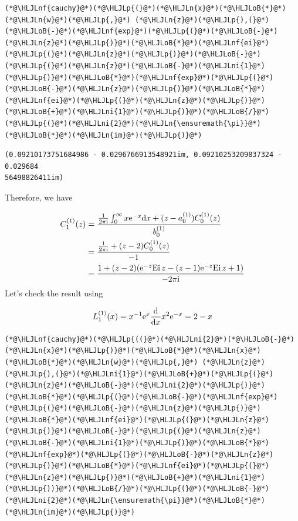 \documentclass[12pt,a4paper]{article}
\newcommand{\HLJLn}[1]{#1}
\newcommand{\HLJLnf}[1]{\textcolor[RGB]{66,102,213}{#1}}
\newcommand{\HLJLni}[1]{\textcolor[RGB]{59,151,46}{#1}}
\newcommand{\HLJLoB}[1]{\textcolor[RGB]{102,102,102}{\textbf{#1}}}
\newcommand{\HLJLp}[1]{#1}
\def\D{ {\rm d} }
\def\I{ {\rm i} }
\def\E{ {\rm e} }
\def\Ei{ {\rm Ei}\, }
\def\dx{\D x}
\begin{document}
\begin{lstlisting}
(*@\HLJLnf{cauchy}@*)(*@\HLJLp{(}@*)(*@\HLJLn{x}@*)(*@\HLJLoB{*}@*)(*@\HLJLn{w}@*)(*@\HLJLp{,}@*) (*@\HLJLn{z}@*)(*@\HLJLp{),(}@*)(*@\HLJLoB{-}@*)(*@\HLJLnf{exp}@*)(*@\HLJLp{(}@*)(*@\HLJLoB{-}@*)(*@\HLJLn{z}@*)(*@\HLJLp{)}@*)(*@\HLJLoB{*}@*)(*@\HLJLnf{ei}@*)(*@\HLJLp{(}@*)(*@\HLJLn{z}@*)(*@\HLJLp{)}@*)(*@\HLJLoB{-}@*)(*@\HLJLp{(}@*)(*@\HLJLn{z}@*)(*@\HLJLoB{-}@*)(*@\HLJLni{1}@*)(*@\HLJLp{)}@*)(*@\HLJLoB{*}@*)(*@\HLJLnf{exp}@*)(*@\HLJLp{(}@*)(*@\HLJLoB{-}@*)(*@\HLJLn{z}@*)(*@\HLJLp{)}@*)(*@\HLJLoB{*}@*)(*@\HLJLnf{ei}@*)(*@\HLJLp{(}@*)(*@\HLJLn{z}@*)(*@\HLJLp{)}@*)(*@\HLJLoB{+}@*)(*@\HLJLni{1}@*)(*@\HLJLp{)}@*)(*@\HLJLoB{/}@*)(*@\HLJLp{(}@*)(*@\HLJLni{2}@*)(*@\HLJLn{\ensuremath{\pi}}@*)(*@\HLJLoB{*}@*)(*@\HLJLn{im}@*)(*@\HLJLp{)}@*)
\end{lstlisting}

\begin{lstlisting}
(0.09210173751684986 - 0.0296766913548921im, 0.09210253209837324 - 0.029684
56498826411im)
\end{lstlisting}


Therefore, we have


\begin{align*}
C_1^{(1)}(z) &= {{1 \over 2 \pi \I} \int_0^\infty x \E^{-x} \dx + (z-a_0^{(1)}) C_0^{(1)}(z) \over b_0^{(1)}} \\
&=  {{1 \over 2 \pi \I}  + (z-2) C_0^{(1)}(z) \over -1}\\
&=  {1  + (z-2) (\E^{-z} \Ei z - (z-1) \E^{-z} \Ei z +1) \over -2 \pi \I}
\end{align*}
Let's check the result using

\[
L_1^{(1)}(x) = x^{-1} \E^x {\D \over \dx} x^2 \E^{-x} = 2 - x
\]

\begin{lstlisting}
(*@\HLJLnf{cauchy}@*)(*@\HLJLp{((}@*)(*@\HLJLni{2}@*)(*@\HLJLoB{-}@*)(*@\HLJLn{x}@*)(*@\HLJLp{)}@*)(*@\HLJLoB{*}@*)(*@\HLJLn{x}@*)(*@\HLJLoB{*}@*)(*@\HLJLn{w}@*)(*@\HLJLp{,}@*) (*@\HLJLn{z}@*)(*@\HLJLp{),(}@*)(*@\HLJLni{1}@*)(*@\HLJLoB{+}@*)(*@\HLJLp{(}@*)(*@\HLJLn{z}@*)(*@\HLJLoB{-}@*)(*@\HLJLni{2}@*)(*@\HLJLp{)}@*)(*@\HLJLoB{*}@*)(*@\HLJLp{(}@*)(*@\HLJLoB{-}@*)(*@\HLJLnf{exp}@*)(*@\HLJLp{(}@*)(*@\HLJLoB{-}@*)(*@\HLJLn{z}@*)(*@\HLJLp{)}@*)(*@\HLJLoB{*}@*)(*@\HLJLnf{ei}@*)(*@\HLJLp{(}@*)(*@\HLJLn{z}@*)(*@\HLJLp{)}@*)(*@\HLJLoB{-}@*)(*@\HLJLp{(}@*)(*@\HLJLn{z}@*)(*@\HLJLoB{-}@*)(*@\HLJLni{1}@*)(*@\HLJLp{)}@*)(*@\HLJLoB{*}@*)(*@\HLJLnf{exp}@*)(*@\HLJLp{(}@*)(*@\HLJLoB{-}@*)(*@\HLJLn{z}@*)(*@\HLJLp{)}@*)(*@\HLJLoB{*}@*)(*@\HLJLnf{ei}@*)(*@\HLJLp{(}@*)(*@\HLJLn{z}@*)(*@\HLJLp{)}@*)(*@\HLJLoB{+}@*)(*@\HLJLni{1}@*)(*@\HLJLp{))}@*)(*@\HLJLoB{/}@*)(*@\HLJLp{(}@*)(*@\HLJLoB{-}@*)(*@\HLJLni{2}@*)(*@\HLJLn{\ensuremath{\pi}}@*)(*@\HLJLoB{*}@*)(*@\HLJLn{im}@*)(*@\HLJLp{)}@*)
\end{lstlisting}
\end{document}
